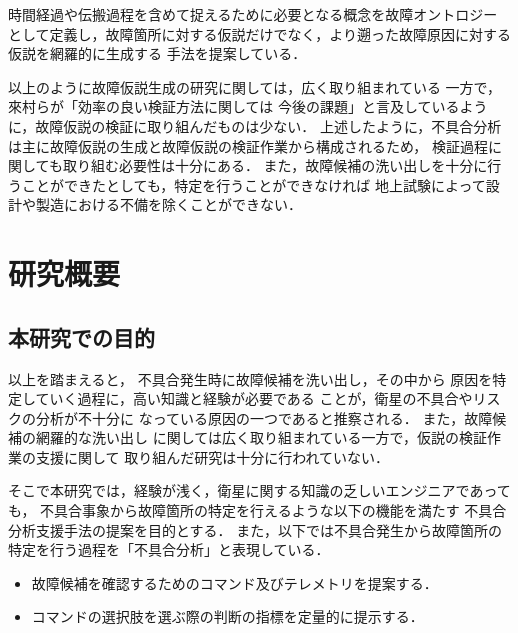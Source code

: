 \documentclass[11pt]{jsreport}
\begin{document}
時間経過や伝搬過程を含めて捉えるために必要となる概念を故障オントロジー\cite{Ontology1998}
として定義し，故障箇所に対する仮説だけでなく，より遡った故障原因に対する仮説を網羅的に生成する
手法を提案している．\\

以上のように故障仮説生成の研究に関しては，広く取り組まれている
一方で，來村ら\cite{Kitamura1999}が「効率の良い検証方法に関しては
今後の課題」と言及しているように，故障仮説の検証に取り組んだものは少ない．
上述したように，不具合分析は主に故障仮説の生成と故障仮説の検証作業から構成されるため，
検証過程に関しても取り組む必要性は十分にある．
また，故障候補の洗い出しを十分に行うことができたとしても，特定を行うことができなければ
地上試験によって設計や製造における不備を除くことができない．

\section{研究概要}
\subsection{本研究での目的}
以上を踏まえると，
不具合発生時に故障候補を洗い出し，その中から
原因を特定していく過程に，高い知識と経験が必要である
ことが，衛星の不具合やリスクの分析が不十分に
なっている原因の一つであると推察される．
また，故障候補の網羅的な洗い出し
に関しては広く取り組まれている一方で，仮説の検証作業の支援に関して
取り組んだ研究は十分に行われていない．

そこで本研究では，経験が浅く，衛星に関する知識の乏しいエンジニアであっても，
不具合事象から故障箇所の特定を行えるような以下の機能を満たす
不具合分析支援手法の提案を目的とする．
また，以下では不具合発生から故障箇所の特定を行う過程を「不具合分析」と表現している．\\

\begin{itemize}
  \item 故障候補を確認するためのコマンド及びテレメトリを提案する．
  \item コマンドの選択肢を選ぶ際の判断の指標を定量的に提示する．
\end{itemize}
\end{document}
